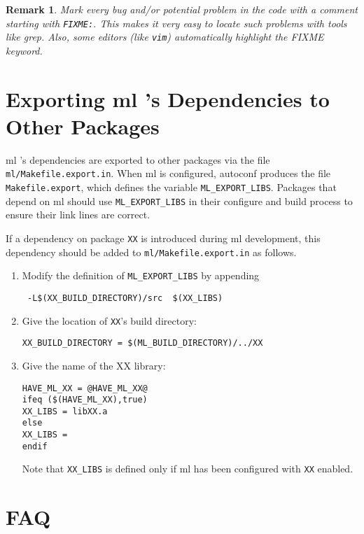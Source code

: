 \documentclass[10pt,letter,relax]{SANDreport}
\newtheorem{remark}{Remark}
\newcommand{\ML}     {{\sc ml }}
\begin{document}
\begin{remark} 
  Mark every bug and/or potential problem in the code with a comment
  starting with \verb!FIXME:!. This makes it very easy to locate such
  problems with tools like grep. Also, some editors (like \verb!vim!)
  automatically highlight the FIXME keyword.
\end{remark}


\section{Exporting \ML's Dependencies to Other Packages}
\label{exporting dependencies}

\ML's dependencies are exported to other packages via the file
{\tt ml/Makefile.export.in}.
When \ML is configured, autoconf produces the file {\tt Makefile.export},
which defines the variable {\tt ML\_EXPORT\_LIBS}. 
Packages that depend on \ML should use {\tt ML\_EXPORT\_LIBS} in their
configure and build process to ensure their link lines are correct.

If a dependency on package {\tt XX} is introduced during \ML development,
this dependency should be added to {\tt ml/Makefile.export.in} as follows.
\begin{enumerate}
    \item Modify the definition of {\tt ML\_EXPORT\_LIBS} by appending
\begin{verbatim}
 -L$(XX_BUILD_DIRECTORY)/src  $(XX_LIBS)
\end{verbatim}
 

    \item Give the location of {\tt XX}'s build directory:
\begin{verbatim}
XX_BUILD_DIRECTORY = $(ML_BUILD_DIRECTORY)/../XX
\end{verbatim}

    \item Give the name of the XX library:
\begin{verbatim}
HAVE_ML_XX = @HAVE_ML_XX@
ifeq ($(HAVE_ML_XX),true)
XX_LIBS = libXX.a
else
XX_LIBS =
endif
\end{verbatim}
Note that {\tt XX\_LIBS} is defined only if \ML has been configured with
{\tt XX} enabled.
\end{enumerate}



\section{FAQ}
\label{sec:faq}
\end{document}
